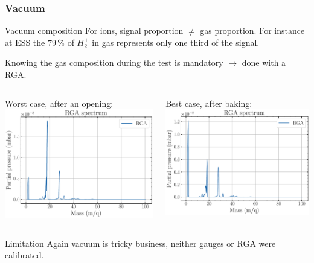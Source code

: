 \begin{frame}[t]
  \frametitle{Vacuum}
  \begin{block}{Vacuum composition}
    For ions, signal proportion $\neq$ gas proportion. For instance at ESS the $79\,\%$ of $H^{+}_{2}$ in gas represents only one third of the signal.

    Knowing the gas composition during the test is mandatory $\rightarrow$ done with a RGA.
  \end{block}
  \begin{columns}[T]
    \begin{column}{0.45\textwidth}
      Worst case, after an opening:
      \centering
      \includegraphics[width=1\textwidth]{06_Backup/fig/fig000_rga_b}
    \end{column}
    \begin{column}{0.45\textwidth}
      Best case, after baking:
      \centering
      \includegraphics[width=1\textwidth]{06_Backup/fig/fig000_rga_a}
    \end{column}
  \end{columns}

  \begin{alertblock}{Limitation}
    Again vacuum is tricky business, neither gauges or RGA were calibrated.
  \end{alertblock}
\end{frame}

